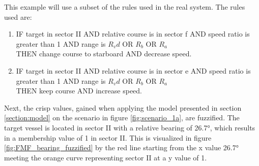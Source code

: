 This example will use a subset of the rules used in the real system.
The rules used are:
\begin{enumerate}[label=\textbf{Rule \arabic*},ref=Rule \arabic*]
    \item \label{rule:1} IF target in sector II AND relative course is in sector f  AND speed ratio is greater than 1  AND range is $R_vd$ OR $R_b$ OR $R_a$ \\THEN change course to starboard  AND  decrease speed.
    \item IF target in sector II AND relative course is in sector e AND  speed ratio is greater than 1  AND  range is $R_vd$ OR $R_b$ OR $R_a$ \\THEN keep course   AND  increase speed.
\end{enumerate}

Next, the crisp values, gained when applying the model presented in section \ref{section:model} on the scenario in figure \ref{fig:scenario_1a}, are fuzzified. The target vessel is located in sector II with a relative bearing of \ang{26.7}, which results in a membership value of 1 in sector II. This is visualized in figure \ref{fig:FMF_bearing_fuzzified} by the red line starting from the x value \ang{26.7} meeting the orange curve representing sector II at a y value of 1.

